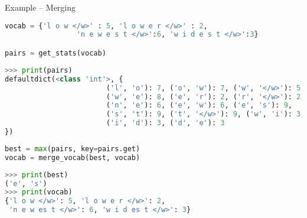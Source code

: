 
\begin{vbframe}{Example -- Merging \href{https://www.aclweb.org/anthology/P16-1162.pdf}{}}

\vspace{-.5cm}

\begin{lstlisting}[language=Python]
vocab = {'l o w </w>' : 5, 'l o w e r </w>' : 2, 
				 'n e w e s t </w>':6, 'w i d e s t </w>':3}

pairs = get_stats(vocab)
\end{lstlisting}

\vspace{-.75cm}

\begin{lstlisting}[language=Python]
>>> print(pairs)
defaultdict(<class 'int'>, {
						('l', 'o'): 7, ('o', 'w'): 7, ('w', '</w>'): 5, 
						('w', 'e'): 8, ('e', 'r'): 2, ('r', '</w>'): 2, 
						('n', 'e'): 6, ('e', 'w'): 6, ('e', 's'): 9, 
						('s', 't'): 9, ('t', '</w>'): 9, ('w', 'i'): 3, 
						('i', 'd'): 3, ('d', 'e'): 3
})
\end{lstlisting}

\vspace{-.5cm}

\begin{lstlisting}[language=Python]
best = max(pairs, key=pairs.get)
vocab = merge_vocab(best, vocab)
\end{lstlisting}

\vspace{-.75cm}

\begin{lstlisting}[language=Python]
>>> print(best)
('e', 's')
>>> print(vocab)
{'l o w </w>': 5, 'l o w e r </w>': 2, 
 'n e w es t </w>': 6, 'w i d es t </w>': 3}
\end{lstlisting}

\end{vbframe}


